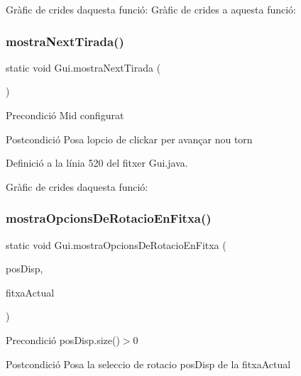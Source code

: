 Gràfic de crides d\textquotesingle{}aquesta funció\+:
Gràfic de crides a aquesta funció\+:
\mbox{\label{class_gui_a57472094cd3fe87243415881b6a2f928}} 
\subsubsection{\texorpdfstring{mostra\+Next\+Tirada()}{mostraNextTirada()}}
{\footnotesize\ttfamily static void Gui.\+mostra\+Next\+Tirada (\begin{DoxyParamCaption}{ }\end{DoxyParamCaption})\hspace{0.3cm}{\ttfamily [static]}}

\begin{DoxyPrecond}{Precondició}
Mid configurat 
\end{DoxyPrecond}
\begin{DoxyPostcond}{Postcondició}
Posa l\textquotesingle{}opcio de clickar per avançar nou torn 
\end{DoxyPostcond}


Definició a la línia 520 del fitxer Gui.\+java.

Gràfic de crides d\textquotesingle{}aquesta funció\+:
\mbox{\label{class_gui_a14de8e45496b14e62ca59676d0aae3fe}} 
\subsubsection{\texorpdfstring{mostra\+Opcions\+De\+Rotacio\+En\+Fitxa()}{mostraOpcionsDeRotacioEnFitxa()}}
{\footnotesize\ttfamily static void Gui.\+mostra\+Opcions\+De\+Rotacio\+En\+Fitxa (\begin{DoxyParamCaption}\item[{Array\+List$<$ \mbox{\hyperlink{class_posicio}{Posicio}} $>$}]{pos\+Disp,  }\item[{\mbox{\hyperlink{class_fitxa}{Fitxa}}}]{fitxa\+Actual }\end{DoxyParamCaption})\hspace{0.3cm}{\ttfamily [static]}}

\begin{DoxyPrecond}{Precondició}
pos\+Disp.\+size()$>$0 
\end{DoxyPrecond}
\begin{DoxyPostcond}{Postcondició}
Posa la seleccio de rotacio \textquotesingle{}pos\+Disp\textquotesingle{} de la fitxa\+Actual 
\end{DoxyPostcond}


